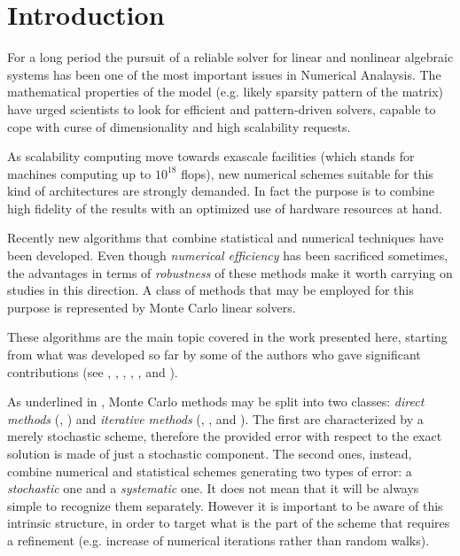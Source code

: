 \section{Introduction}

For a long period the
pursuit of a reliable solver for linear and nonlinear algebraic systems has
been one of the most important issues in Numerical Analaysis. The
mathematical properties of the model (e.g. likely sparsity pattern of the
matrix) have urged scientists to look for efficient and pattern-driven
solvers, capable to cope with curse of dimensionality and high scalability
requests.

As scalability computing move towards exascale facilities (which stands for
machines computing up to $10^{18}$ flops), new numerical schemes suitable for
this
kind of architectures are strongly demanded. In fact the purpose is to combine
high
fidelity of the results with an optimized use of hardware resources at hand.

Recently new algorithms that combine statistical and numerical techniques have
been developed. Even though \textit{numerical efficiency} has been sacrificed
sometimes, the advantages in terms of \textit{robustness} of these methods make
it worth carrying on studies in this direction.
A class of methods that may be employed for this purpose is represented by
Monte Carlo linear solvers.

These algorithms are the main topic covered in the work presented here,
starting from what was developed so far by some of
the authors who gave significant contributions (see \cite{Hal1962},
\cite{Hal1994},
\cite{DA1998}, \cite{DVA2001}, \cite{AADBTW2005},\cite{ESW2013} and
\cite{EMSH2014}). \newline

As underlined in \cite{DA1998}, Monte Carlo methods may be split into two
classes: \textit{direct methods} (\cite{DA1998}, \cite{DVA2001}) and
\textit{iterative methods} (\cite{Hal1962},
\cite{Hal1994}, \cite{ESW2013}
and \cite{EMSH2014}). The first are characterized by a merely stochastic
scheme,
therefore the provided error with respect to the exact solution is made of
just a stochastic component. The second ones, instead, combine numerical and
statistical schemes generating two types of error: a
\textit{stochastic} one and a \textit{systematic} one. It does not
mean
that
it will be always simple to recognize them separately. However it is important
to
be
aware of this intrinsic structure, in order to target what is the part of the
scheme that requires a refinement (e.g. increase of numerical iterations
rather than random walks).\newline

